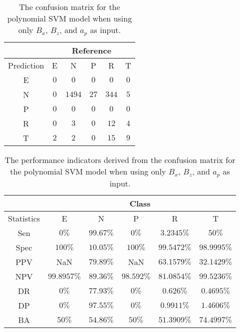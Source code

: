 \begin{table}[!ht]
	\centering
	\begin{tabular}{|c|c|c|c|c|c|}
		\hline
		 & \multicolumn{5}{|c|}{Reference} \\ \hline
		 Prediction & E & N & P & R & T \\ \hline
		 E & $0$ & $0$ & $0$ & $0$ & $0$ \\ \hline
		 N & $0$ & $1494$ & $27$ & $344$ & $5$ \\ \hline
		 P & $0$ & $0$ & $0$ & $0$ & $0$ \\ \hline
		 R & $0$ & $3$ & $0$ & $12$ & $4$ \\ \hline
		 T & $2$ & $2$ & $0$ & $15$ & $9$ \\ \hline
	\end{tabular}
	\caption{The confusion matrix for the polynomial SVM model when using only $B_{x}$, $B_{z}$, and $a_{p}$ as input.}
	\label{tab:cm:xzap:svmPoly}
\end{table}

\begin{table}[!ht]
	\centering
	\begin{tabular}{|c|c|c|c|c|c|}
		\hline
		 & \multicolumn{5}{c|}{Class} \\ \hline
		Statistics & E & N & P & R & T \\ \hline
		Sen & $0\%$ & $99.67\%$ & $0\%$ & $3.2345\%$ & $50\%$ \\ \hline
		Spec & $100\%$ & $10.05\%$ & $100\%$ & $99.5472\%$ & $98.9995\%$ \\ \hline
		PPV & NaN & $79.89\%$ & NaN & $63.1579\%$ & $32.1429\%$ \\ \hline
		NPV & $99.8957\%$ & $89.36\%$ & $98.592\%$ & $81.0854\%$ & $99.5236\%$ \\ \hline
		DR & $0\%$ & $77.93\%$ & $0\%$ & $0.626\%$ & $0.4695\%$ \\ \hline
		DP & $0\%$ & $97.55\%$ & $0\%$ & $0.9911\%$ & $1.4606\%$ \\ \hline
		BA & $50\%$ & $54.86\%$ & $50\%$ & $51.3909\%$ & $74.4997\%$ \\ \hline
	\end{tabular}
	\caption{The performance indicators derived from the confusion matrix for the polynomial SVM model when using only $B_{x}$, $B_{z}$, and $a_{p}$ as input.}
	\label{tab:cs:reverse:xzap:svmPoly}
\end{table}
